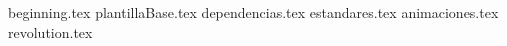 \documentclass[11pt,oneside]{book}%
\begin{document}
	\frontmatter
		\tableofcontents
		{beginning.tex} 
	\mainmatter
%	
	{plantillaBase.tex}
	{dependencias.tex}
	{estandares.tex}
	{animaciones.tex}
	{revolution.tex}
	
\end{document}
